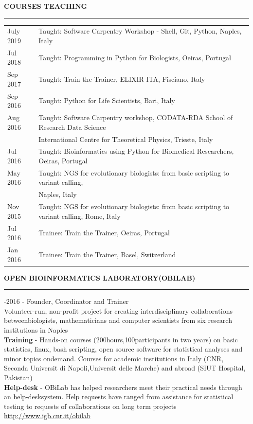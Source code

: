 \documentclass[openany]{book}
\begin{document}
\noindent
\MakeUppercase{\textbf{Courses teaching}} \vspace{0.2cm}
\sectionlineskip
\hrule
\vspace{0.2cm}
\noindent
\begin{tabular}{ l l }
July 2019 & Taught: Software Carpentry Workshop - Shell, Git, Python, Naples, Italy\\
Jul 2018 & Taught: Programming in Python for Biologists, Oeiras, Portugal\\
Sep 2017 & Taught: Train the Trainer, ELIXIR-ITA, Fisciano, Italy\\ 
Sep 2016 & Taught: Python for Life Scientists, Bari, Italy\\
Aug 2016 & Taught: Software Carpentry workshop, CODATA-RDA School of Research Data Science\\ 
 & International Centre for Theoretical Physics, Trieste, Italy\\
Jul 2016 & Taught: Bioinformatics using Python for Biomedical Researchers, Oeiras, Portugal\\ 
May 2016 & Taught: NGS for evolutionary biologists: from basic scripting to variant calling,\\ & Naples, Italy\\
Nov 2015 & Taught: NGS for evolutionary biologists: from basic scripting to variant calling, Rome, Italy\\
Jul 2016 & Trainee: Train the Trainer, Oeiras, Portugal\\
Jan 2016 & Trainee: Train the Trainer, Basel, Switzerland\\
\end{tabular}
\newline


\vspace{0.4cm}
\noindent
\MakeUppercase{\textbf{Open Bioinformatics Laboratory(OBiLab)}} \vspace{0.02cm}
\hrule
{}-2016 - Founder, Coordinator and Trainer\\
Volunteer-run, non-profit project for creating interdisciplinary collaborations betweenbiologists, mathematicians and computer scientists from six research institutions in Naples\\
\textbf{Training} - Hands-on courses (200hours,100participants in two years) on basic statistics, linux, bash scripting, open source software for statistical analyses and minor topics ondemand. Courses for academic institutions in Italy (CNR, Seconda Universit di Napoli,Universit delle Marche) and abroad (SIUT Hospital, Pakistan)\\
\textbf{Help-desk} - OBiLab has helped researchers meet their practical needs through an help-desksystem. Help requests have ranged from assistance for statistical testing to requests of collaborations on long term projects\\
\url{http://www.igb.cnr.it/obilab}\\
\end{document}
